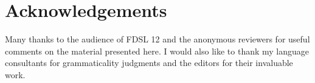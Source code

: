 \documentclass[output=paper,modfonts,newtxmath,hidelinks]{langscibook}
\begin{document}
\section*{Acknowledgements}

Many thanks to the audience of FDSL 12 and the anonymous reviewers for useful comments on the material presented here. I would also like to thank my language consultants for grammaticality judgments and the editors for their invaluable work.

\sloppy
\printbibliography[heading=subbibliography,notkeyword=this]
\end{document}
